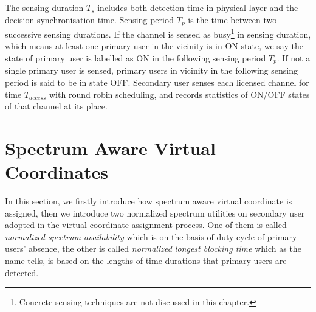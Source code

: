 The sensing duration $T_s$ includes both detection time in physical layer and the decision synchronisation time.
Sensing period $T_p$ is the time between two successive sensing durations.
If the channel is sensed as busy\footnote{Concrete sensing techniques are not discussed in this chapter.} in sensing duration, which means at least one primary user in the vicinity is in ON state, we say the state of primary user is labelled as ON in the following sensing period $T_p$.
If not a single primary user is sensed, primary users in vicinity in the following sensing period is said to be in state OFF.
Secondary user senses each licensed channel for time $T_{access}$ with round robin scheduling, and records statistics of ON/OFF states of that channel at its place.


\section{Spectrum Aware Virtual Coordinates}
In this section, we firstly introduce how spectrum aware virtual coordinate is assigned, then we introduce two normalized spectrum utilities on secondary user adopted in the virtual coordinate assignment process.
One of them is called \textit{normalized spectrum availability} which is on the basis of duty cycle of primary users' absence, the other is called \textit{normalized longest blocking time} which as the name tells, is based on the lengths of time durations that primary users are detected.

